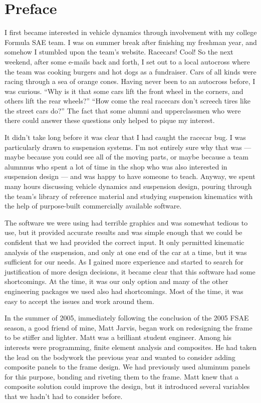 \chapter{Preface}

I first became interested in vehicle dynamics through involvement with my college Formula SAE team.  I was on summer break after finishing my freshman year, and somehow I stumbled upon the team's website.  Racecars!  Cool!  So the next weekend, after some e-mails back and forth, I set out to a local autocross where the team was cooking burgers and hot dogs as a fundraiser.  Cars of all kinds were racing through a sea of orange cones.  Having never been to an autocross before, I was curious.  ``Why is it that some cars lift the front wheel in the corners, and others lift the rear wheels?''  ``How come the real racecars don't screech tires like the street cars do?''  The fact that some alumni and upperclassmen who were there could answer these questions only helped to pique my interest.

It didn't take long before it was clear that I had caught the racecar bug.  I was particularly drawn to suspension systems.  I'm not entirely sure why that was --- maybe because you could see all of the moving parts, or maybe because a team alumnnus who spent a lot of time in the shop who was also interested in suspension design --- and was happy to have someone to teach.  Anyway, we spent many hours discussing vehicle dynamics and suspension design, pouring through the team's library of reference material and studying suspension kinematics with the help of purpose-built commercially available software.

The software we were using had terrible graphics and was somewhat tedious to use, but it provided accurate results and was simple enough that we could be confident that we had provided the correct input.  It only permitted kinematic analysis of the suspension, and only at one end of the car at a time, but it was sufficient for our needs.  As I gained more experience and started to search for justification of more design decisions, it became clear that this software had some shortcomings.  At the time, it was our only option and many of the other engineering packages we used also had shortcomings.  Most of the time, it was easy to accept the issues and work around them.

In the summer of 2005, immediately following the conclusion of the 2005 FSAE season, a good friend of mine, Matt Jarvis, began work on redesigning the frame to be stiffer and lighter.  Matt was a brilliant student engineer.  Among his interests were programming, finite element analysis and composites.  He had taken the lead on the bodywork the previous year and wanted to consider adding composite panels to the frame design.  We had previously used aluminum panels for this purpose, bonding and riveting them to the frame.  Matt knew that a composite solution could improve the design, but it introduced several variables that we hadn't had to consider before.

